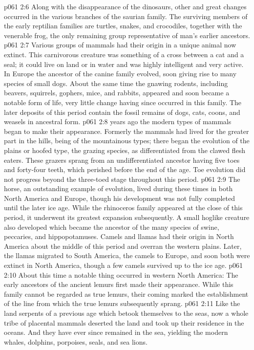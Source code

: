 \vs p061 2:6 Along with the disappearance of the dinosaurs, other and great changes occurred in the various branches of the saurian family. The surviving members of the early reptilian families are turtles, snakes, and crocodiles, together with the venerable frog, the only remaining group representative of man’s earlier ancestors.
\vs p061 2:7 Various groups of mammals had their origin in a unique animal now extinct. This carnivorous creature was something of a cross between a cat and a seal; it could live on land or in water and was highly intelligent and very active. In Europe the ancestor of the canine family evolved, soon giving rise to many species of small dogs. About the same time the gnawing rodents, including beavers, squirrels, gophers, mice, and rabbits, appeared and soon became a notable form of life, very little change having since occurred in this family. The later deposits of this period contain the fossil remains of dogs, cats, coons, and weasels in ancestral form.
\vs p061 2:8 \pc {} years ago the modern types of mammals began to make their appearance. Formerly the mammals had lived for the greater part in the hills, being of the mountainous types;  there began the evolution of the plains or hoofed type, the grazing species, as differentiated from the clawed flesh eaters. These grazers sprang from an undifferentiated ancestor having five toes and forty\hyp{}four teeth, which perished before the end of the age. Toe evolution did not progress beyond the three\hyp{}toed stage throughout this period.
\vs p061 2:9 The horse, an outstanding example of evolution, lived during these times in both North America and Europe, though his development was not fully completed until the later ice age. While the rhinoceros family appeared at the close of this period, it underwent its greatest expansion subsequently. A small hoglike creature also developed which became the ancestor of the many species of swine, peccaries, and hippopotamuses. Camels and llamas had their origin in North America about the middle of this period and overran the western plains. Later, the llamas migrated to South America, the camels to Europe, and soon both were extinct in North America, though a few camels survived up to the ice age.
\vs p061 2:10 About this time a notable thing occurred in western North America: The early ancestors of the ancient lemurs first made their appearance. While this family cannot be regarded as true lemurs, their coming marked the establishment of the line from which the true lemurs subsequently sprang.
\vs p061 2:11 Like the land serpents of a previous age which betook themselves to the seas, now a whole tribe of placental mammals deserted the land and took up their residence in the oceans. And they have ever since remained in the sea, yielding the modern whales, dolphins, porpoises, seals, and sea lions.
